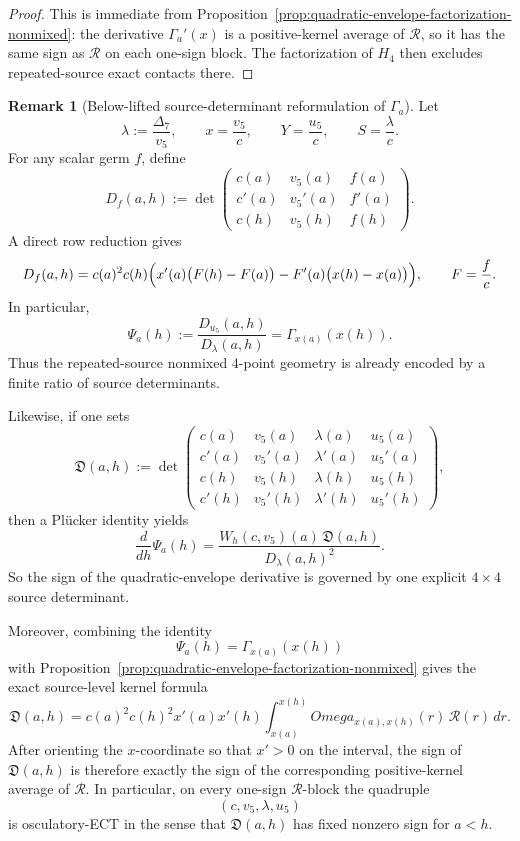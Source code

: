 \documentclass[11pt,a4paper]{amsart}
\def\Omega{Omega}%
\theoremstyle{plain}
\theoremstyle{definition}
\newtheorem{remark}[theorem]{Remark}
\begin{document}
\begin{proof}
This is immediate from Proposition~\ref{prop:quadratic-envelope-factorization-nonmixed}:
the derivative $\Gamma_a'(x)$ is a positive-kernel average of $\mathcal R$,
so it has the same sign as $\mathcal R$ on each one-sign block. The factorization
of $H_4$ then excludes repeated-source exact contacts there.
\end{proof}

\begin{remark}[Below-lifted source-determinant reformulation of $\Gamma_a$]
\label{rem:source-determinant-reformulation-Gammaa}
Let
\[
\lambda:=\frac{\Delta_7}{v_5},
\qquad
x=\frac{v_5}{c},
\qquad
Y=\frac{u_5}{c},
\qquad
S=\frac{\lambda}{c}.
\]
For any scalar germ $f$, define
\[
D_f(a,h):=
\det\!\begin{pmatrix}
c(a)&v_5(a)&f(a)\\
c'(a)&v_5'(a)&f'(a)\\
c(h)&v_5(h)&f(h)
\end{pmatrix}.
\]
A direct row reduction gives
\[
D_f(a,h)
=
c(a)^2c(h)\Bigl(
x'(a)\bigl(F(h)-F(a)\bigr)-F'(a)\bigl(x(h)-x(a)\bigr)
\Bigr),
\qquad
F=\frac{f}{c}.
\]
In particular,
\[
\Psi_a(h):=\frac{D_{u_5}(a,h)}{D_\lambda(a,h)}
=
\Gamma_{x(a)}(x(h)).
\]
Thus the repeated-source nonmixed $4$-point geometry is already encoded by a
finite ratio of source determinants.

Likewise, if one sets
\[
\mathfrak D(a,h):=
\det\!\begin{pmatrix}
c(a)&v_5(a)&\lambda(a)&u_5(a)\\
c'(a)&v_5'(a)&\lambda'(a)&u_5'(a)\\
c(h)&v_5(h)&\lambda(h)&u_5(h)\\
c'(h)&v_5'(h)&\lambda'(h)&u_5'(h)
\end{pmatrix},
\]
then a Pl\"ucker identity yields
\[
\frac{d}{dh}\Psi_a(h)
=
\frac{W_h(c,v_5)(a)\,\mathfrak D(a,h)}{D_\lambda(a,h)^2}.
\]
So the sign of the quadratic-envelope derivative is governed by one explicit
$4\times 4$ source determinant.

Moreover, combining the identity
\[
\Psi_a(h)=\Gamma_{x(a)}(x(h))
\]
with Proposition~\ref{prop:quadratic-envelope-factorization-nonmixed} gives the
exact source-level kernel formula
\[
\mathfrak D(a,h)
=
c(a)^2c(h)^2x'(a)x'(h)
\int_{x(a)}^{x(h)} \Omega_{x(a),x(h)}(r)\,\mathcal R(r)\,dr.
\]
After orienting the $x$-coordinate so that $x'>0$ on the interval, the sign
of $\mathfrak D(a,h)$ is therefore exactly the sign of the corresponding
positive-kernel average of $\mathcal R$. In particular, on every one-sign
$\mathcal R$-block the quadruple
\[
(c,v_5,\lambda,u_5)
\]
is osculatory-ECT in the sense that $\mathfrak D(a,h)$ has fixed nonzero sign
for $a<h$.
\end{remark}
\end{document}
